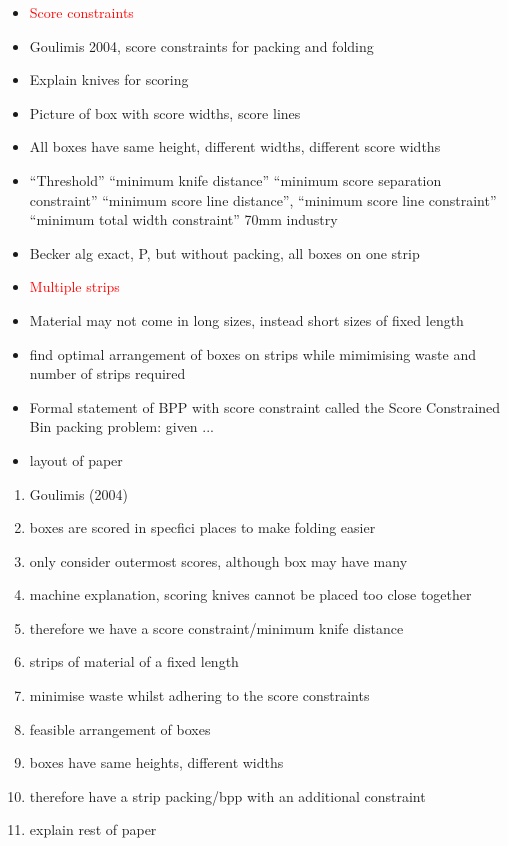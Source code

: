 \documentclass{llncs}
\begin{document}
\begin{itemize}
	\item \textcolor{red}{Score constraints}	
	\item Goulimis 2004, score constraints for packing and folding
	\item Explain knives for scoring
	\item Picture of box with score widths, score lines
	\item All boxes have same height, different widths, different score widths
	\item ``Threshold'' ``minimum knife distance'' ``minimum score separation constraint'' ``minimum score line distance'', ``minimum score line constraint'' ``minimum total width constraint'' 70mm industry
	\item Becker alg exact, P, but without packing, all boxes on one strip
	\item \textcolor{red}{Multiple strips}
	\item Material may not come in long sizes, instead short sizes of fixed length
	\item find optimal arrangement of boxes on strips while mimimising waste and number of strips required
	
	\item Formal statement of BPP with score constraint called the Score Constrained Bin packing problem: given ...
	
	\item layout of paper
\end{itemize}

\begin{enumerate}
	\item Goulimis (2004)
	\item boxes are scored in specfici places to make folding easier 
	\item only consider outermost scores, although box may have many 
	\item machine explanation, scoring knives cannot be placed too close together
	\item therefore we have a score constraint/minimum knife distance
	\item strips of material of a fixed length
	\item minimise waste whilst adhering to the score constraints
	\item feasible arrangement of boxes
	\item boxes have same heights, different widths
	\item therefore have a strip packing/bpp with an additional constraint
	\item explain rest of paper
\end{enumerate}
\end{document}

